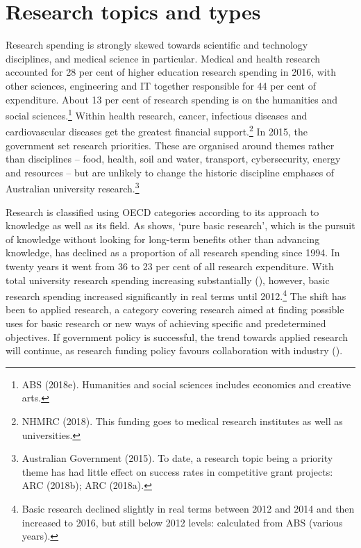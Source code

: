 \documentclass{grattan}
\begin{document}
%
\section{Research topics and types}\label{sec:research-topics-and-types}

Research spending is strongly skewed towards scientific and technology disciplines, and medical science in particular. Medical and health research accounted for 28 per cent of higher education research spending in 2016, with other sciences, engineering and IT together responsible for 44 per cent of expenditure. About 13 per cent of research spending is on the humanities and social sciences.\footnote{ABS (2018e). Humanities and social sciences includes economics and creative arts.} Within health research, cancer, infectious diseases and cardiovascular diseases get the greatest financial support.\footnote{NHMRC (2018). This funding goes to medical research institutes as well as universities.} In 2015, the government set research priorities. These are organised around themes rather than disciplines -- food, health, soil and water, transport, cybersecurity, energy and resources -- but are unlikely to change the historic discipline emphases of Australian university research.\footnote{Australian Government (2015). To date, a research topic being a priority theme has had little effect on success rates in competitive grant projects: ARC (2018b); ARC (2018a).}

Research is classified using OECD categories according to its approach to knowledge as well as its field. As  shows, `pure basic research', which is the pursuit of knowledge without looking for long-term benefits other than advancing knowledge, has declined as a proportion of all research spending since 1994. In twenty years it went from 36 to 23 per cent of all research expenditure. With total university research spending increasing substantially (), however, basic research spending increased significantly in real terms until 2012.\footnote{Basic research declined slightly in real terms between 2012 and 2014 and then increased to 2016, but still below 2012 levels: calculated from ABS (various years).} The shift has been to applied research, a category covering research aimed at finding possible uses for basic research or new ways of achieving specific and predetermined objectives. If government policy is successful, the trend towards applied research will continue, as research funding policy favours collaboration with industry ().
\end{document}
